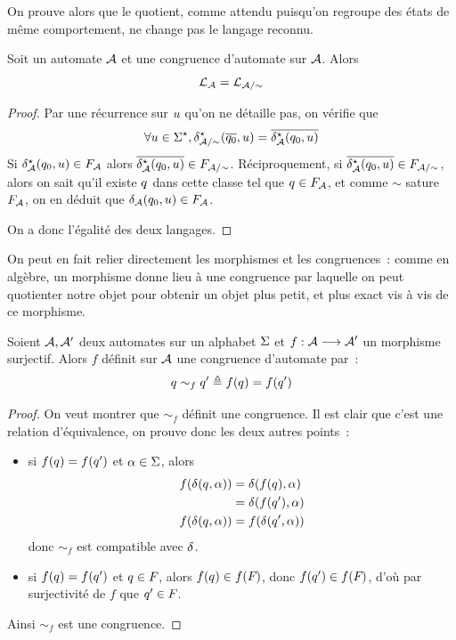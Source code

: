 On prouve alors que le quotient, comme attendu puisqu'on regroupe des états de
même comportement, ne change pas le langage reconnu.

\begin{proposition}
  Soit un automate $\mathcal{A}$ et une congruence d'automate sur $\mathcal{A}$.
  Alors
  \[\mathcal L_{\mathcal{A}} = \mathcal L_{\mathord{\mathcal{A}}\mathbin{/}\mathord{\sim}}\]
\end{proposition}

\begin{proof}
  Par une récurrence sur $u$ qu'on ne détaille pas, on vérifie que
  \[\forall u \in \Sigma^{\star},
  \delta_{\mathord{\mathcal{A}}\mathbin{/}\mathord{\sim}}^{\star}(\overline{q_{0}},u)=
  \overline{\delta_{\mathcal{A}}^{\star}(q_{0},u)}\]
  Si $\delta_{\mathcal{A}}^{\star}(q_{0},u) \in F_{\mathcal{A}}$ alors
  $\overline{\delta_{\mathcal{A}}^{\star}(q_{0},u)} \in F_{\mathord{\mathcal{A}}\mathbin{/}\mathord{\sim}}$.
  Réciproquement, si
  $\overline{\delta_{\mathcal{A}}^{\star}(q_{0},u)} \in F_{\mathord{\mathcal{A}}\mathbin{/}\mathord{\sim}}$, alors on
  sait qu'il existe $q_{}$ dans cette classe tel que $q_{} \in F_{\mathcal{A}}$, et
  comme $\sim$ sature $F_{\mathcal{A}}$, on en déduit que
  $\delta_{\mathcal{A}}(q_{0},u) \in F_{\mathcal{A}}$.

  On a donc l'égalité des deux langages.
\end{proof}

On peut en fait relier directement les morphismes et les congruences~: comme
en algèbre, un morphisme donne lieu à une congruence par laquelle on peut
quotienter notre objet pour obtenir un objet plus petit, et plus \og exact\fg
vis à vis de ce morphisme.

\begin{proposition}
  Soient $\mathcal{A}, \mathcal{A}'$ deux automates sur un alphabet $\Sigma$ et
  $f : \displaystyle \mathcal{A} \longrightarrow \mathcal{A}'$ un morphisme surjectif. Alors $f$ définit
  sur $\mathcal{A}$ une congruence d'automate par~:
  \[q_{}\sim_f q_{}' \triangleq f(q_{}) = f(q_{}')\]
\end{proposition}

\begin{proof}
  On veut montrer que $\sim_f$ définit une congruence. Il est clair que c'est
  une relation d'équivalence, on prouve donc les deux autres points~:
  \begin{itemize}
  \item si $f(q_{}) = f(q_{}')$ et $\alpha \in \Sigma$, alors
    \begin{align*}
      f(\delta_{}(q_{},\alpha)) &= \delta_{}(f(q_{}),\alpha)\\
      &= \delta_{}(f(q_{}'),\alpha)\\
      f(\delta_{}(q_{},\alpha)) &= f(\delta_{}(q_{}',\alpha))
    \end{align*}
    donc $\sim_f$ est compatible avec $\delta_{}$.
  \item si $f(q_{}) = f(q_{}')$ et $q_{} \in F_{}$, alors
    $f(q_{}) \in f(F_{})$, donc $f(q_{}') \in f(F_{})$, d'où par
    surjectivité de $f$ que $q_{}' \in F_{}$.
  \end{itemize}
  Ainsi $\sim_f$ est une congruence.
\end{proof}

